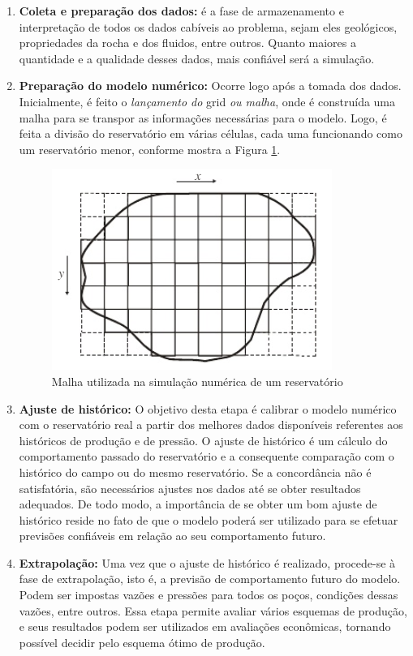 \begin{enumerate}
\item \textbf{Coleta e prepara\c{c}\~{a}o dos dados:} \'{e} a fase de armazenamento e interpreta\c{c}\~{a}o de todos os dados cab\'{i}veis ao problema, sejam eles geol\'{o}gicos, propriedades da rocha e dos fluidos, entre outros. Quanto maiores a quantidade e a qualidade desses dados, mais confi\'{a}vel ser\'{a} a simula\c{c}\~{a}o.
\item \textbf{Prepara\c{c}\~{a}o do modelo num\'{e}rico:} Ocorre logo ap\'{o}s a tomada dos dados. Inicialmente, \'{e} feito o \textit{lan\c{c}amento do} grid \textit{ou malha}, onde \'{e} constru\'{i}da uma malha para se transpor as informa\c{c}\~{o}es necess\'{a}rias para o modelo. Logo, \'{e} feita a divis\~{a}o do reservat\'{o}rio em v\'{a}rias c\'{e}lulas, cada uma funcionando como um reservat\'{o}rio menor, conforme mostra a Figura \ref{fig:revisao_simsec3}.
\begin{figure}[H]
	\centering
	\includegraphics[width=.5\textwidth]{figs/revisao/revisao_simsec3}
	\caption{Malha utilizada na simula\c{c}\~{a}o num\'{e}rica de um reservat\'{o}rio \cite[p. 524]{engres}}
	\label{fig:revisao_simsec3}
\end{figure}
\item \textbf{Ajuste de hist\'{o}rico:} O objetivo desta etapa \'{e} calibrar o modelo num\'{e}rico com o reservat\'{o}rio real a partir dos melhores dados dispon\'{i}veis referentes aos hist\'{o}ricos de produ\c{c}\~{a}o e de press\~{a}o. O ajuste de hist\'{o}rico \'{e} um c\'{a}lculo do comportamento passado do reservat\'{o}rio e a consequente compara\c{c}\~{a}o com o hist\'{o}rico do campo ou do mesmo reservat\'{o}rio. Se a concord\^{a}ncia n\~{a}o \'{e} satisfat\'{o}ria, s\~{a}o necess\'{a}rios ajustes nos dados at\'{e} se obter resultados adequados. De todo modo, a import\^{a}ncia de se obter um bom ajuste de hist\'{o}rico reside no fato de que o modelo poder\'{a} ser utilizado para se efetuar previs\~{o}es confi\'{a}veis em rela\c{c}\~{a}o ao seu comportamento futuro.
\item \textbf{Extrapola\c{c}\~{a}o:} Uma vez que o ajuste de hist\'{o}rico \'{e} realizado, procede-se \`{a} fase de extrapola\c{c}\~{a}o, isto \'{e}, a previs\~{a}o de comportamento futuro do modelo. Podem ser impostas vaz\~{o}es e press\~{o}es para todos os po\c{c}os, condi\c{c}\~{o}es dessas vaz\~{o}es, entre outros. Essa etapa permite avaliar v\'{a}rios esquemas de produ\c{c}\~{a}o, e seus resultados podem ser utilizados em avalia\c{c}\~{o}es econ\^{o}micas, tornando poss\'{i}vel decidir pelo esquema \'{o}timo de produ\c{c}\~{a}o.
\end{enumerate}

